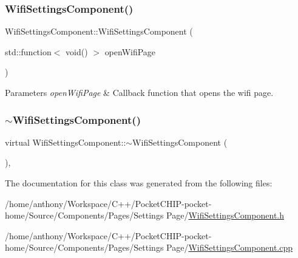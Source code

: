 \subsubsection{\texorpdfstring{Wifi\+Settings\+Component()}{WifiSettingsComponent()}}
{\footnotesize\ttfamily Wifi\+Settings\+Component\+::\+Wifi\+Settings\+Component (\begin{DoxyParamCaption}\item[{std\+::function$<$ void() $>$}]{open\+Wifi\+Page }\end{DoxyParamCaption})}


\begin{DoxyParams}{Parameters}
{\em open\+Wifi\+Page} & Callback function that opens the wifi page. \\
\hline
\end{DoxyParams}
\mbox{\label{classWifiSettingsComponent_ae34273ca25e05d2973837dc39962f55c}} 
\subsubsection{\texorpdfstring{$\sim$\+Wifi\+Settings\+Component()}{~WifiSettingsComponent()}}
{\footnotesize\ttfamily virtual Wifi\+Settings\+Component\+::$\sim$\+Wifi\+Settings\+Component (\begin{DoxyParamCaption}{ }\end{DoxyParamCaption})\hspace{0.3cm}{\ttfamily [inline]}, {\ttfamily [virtual]}}



The documentation for this class was generated from the following files\+:\begin{DoxyCompactItemize}
\item 
/home/anthony/\+Workspace/\+C++/\+Pocket\+C\+H\+I\+P-\/pocket-\/home/\+Source/\+Components/\+Pages/\+Settings Page/\mbox{\hyperlink{WifiSettingsComponent_8h}{Wifi\+Settings\+Component.\+h}}\item 
/home/anthony/\+Workspace/\+C++/\+Pocket\+C\+H\+I\+P-\/pocket-\/home/\+Source/\+Components/\+Pages/\+Settings Page/\mbox{\hyperlink{WifiSettingsComponent_8cpp}{Wifi\+Settings\+Component.\+cpp}}\end{DoxyCompactItemize}
